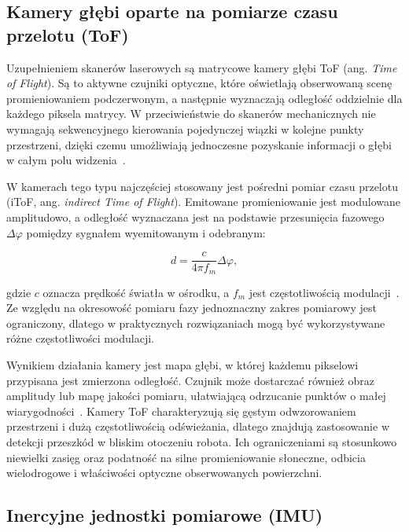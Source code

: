 \documentclass[a4paper,twoside,12pt]{book}
\begin{document}
\subsection{Kamery głębi oparte na pomiarze czasu przelotu (ToF)}

Uzupełnieniem skanerów laserowych są matrycowe kamery głębi ToF (ang. \textit{Time of Flight}). Są to aktywne czujniki optyczne, które oświetlają obserwowaną scenę promieniowaniem podczerwonym, a następnie wyznaczają odległość oddzielnie dla każdego piksela matrycy. W przeciwieństwie do skanerów mechanicznych nie wymagają sekwencyjnego kierowania pojedynczej wiązki w kolejne punkty przestrzeni, dzięki czemu umożliwiają jednoczesne pozyskanie informacji o głębi w całym polu widzenia~\cite{solid_state_tof_cameras}.

W kamerach tego typu najczęściej stosowany jest pośredni pomiar czasu przelotu (iToF, ang. \textit{indirect Time of Flight}). Emitowane promieniowanie jest modulowane amplitudowo, a odległość wyznaczana jest na podstawie przesunięcia fazowego $\Delta\varphi$ pomiędzy sygnałem wyemitowanym i odebranym:

\begin{equation}
    d = \frac{c}{4\pi f_m}\Delta\varphi,
    \label{eq:itof_distance}
\end{equation}

gdzie $c$ oznacza prędkość światła w ośrodku, a $f_m$ jest częstotliwością modulacji~\cite{itof_phase_shift}. Ze względu na okresowość pomiaru fazy jednoznaczny zakres pomiarowy jest ograniczony, dlatego w praktycznych rozwiązaniach mogą być wykorzystywane różne częstotliwości modulacji.

Wynikiem działania kamery jest mapa głębi, w której każdemu pikselowi przypisana jest zmierzona odległość. Czujnik może dostarczać również obraz amplitudy lub mapę jakości pomiaru, ułatwiającą odrzucanie punktów o małej wiarygodności~\cite{tof_confidence_filtering}. Kamery ToF charakteryzują się gęstym odwzorowaniem przestrzeni i dużą częstotliwością odświeżania, dlatego znajdują zastosowanie w detekcji przeszkód w bliskim otoczeniu robota. Ich ograniczeniami są stosunkowo niewielki zasięg oraz podatność na silne promieniowanie słoneczne, odbicia wielodrogowe i właściwości optyczne obserwowanych powierzchni.

\subsection{Inercyjne jednostki pomiarowe (IMU)}
\end{document}
